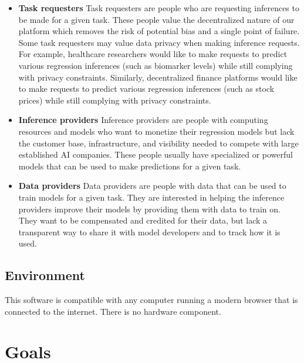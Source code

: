 \documentclass{article}
\begin{document}
\begin{itemize}
    \item \textbf{Task requesters} \newline
    Task requesters are people who are requesting inferences to be made for a given task. These people value the decentralized nature of our platform which 
    removes the risk of potential bias and a single point of failure. 
    Some task requesters may value data privacy when making inference requests.
    For example, healthcare researchers would like to make requests to predict various regression inferences (such as biomarker levels) while still complying with privacy constraints. 
    Similarly, decentralized finance platforms would like to make requests to predict various regression inferences (such as stock prices) while still complying with privacy constraints.

    \item \textbf{Inference providers} \newline
    Inference providers are people with computing resources and models who want to monetize their regression models but lack the customer base, infrastructure, and visibility needed to compete with large established AI companies.
    These people usually have specialized or powerful models that can be used to make predictions for a given task.
   
    \item \textbf{Data providers}   \newline
    Data providers are people with data that can be used to train models for a given task.
    They are interested in helping the inference providers improve their models by providing them with data to train on.
    They want to be compensated and credited for their data, 
    but lack a transparent way to share it with model developers and to track how it 
    is used.
\end{itemize}

\subsection{Environment}

This software is compatible with any computer running a modern browser that is connected to the internet. There is no hardware component. 

\section{Goals}
\end{document}
